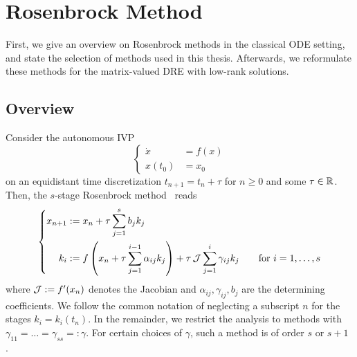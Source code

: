 \chapter{Rosenbrock Method}
\label{sec:ros}

First, we give an overview on Rosenbrock methods in the classical \ac{ODE} setting,
and state the selection of methods used in this thesis.
Afterwards, we reformulate these methods for the matrix-valued \ac{DRE} with low-rank solutions.

\section{Overview}

Consider the autonomous \ac{IVP}
\begin{equation}
\left\{
\begin{aligned}
  \dot x &= f(x) \\
  x(t_0) &= x_0
\end{aligned}
\right.
\end{equation}
on an equidistant time discretization $t_{n+1} = t_n + \tau$ for $n\geq 0$ and some $\tau\in\mathbb{R}$.
Then, the $s$-stage Rosenbrock method~ reads
\begin{equation}
\label{eq:ros:def}
\left\{
\begin{aligned}
  x_{n+1} &:= x_n + \tau \sum_{j=1}^s b_j k_j
  \\
  k_i &:= f\left( x_n + \tau \sum_{j=1}^{i-1} \alpha_{ij} k_j \right) + \tau \operatorname{\mathcal J} \sum_{j=1}^i \gamma_{ij} k_j
  \qquad
  \text{for } i = 1, \ldots, s
\end{aligned}
\right.
\end{equation}
where $\operatorname{\mathcal J} := f'(x_n)$ denotes the Jacobian and $\alpha_{ij}, \gamma_{ij}, b_j$ are the determining coefficients.
We follow the common notation of neglecting a subscript $n$ for the stages $k_i=k_i(t_n)$.
In the remainder, we restrict the analysis to methods with $\gamma_{11} = \ldots = \gamma_{ss} =: \gamma$.
For certain choices of $\gamma$, such a method is of order $s$ or $s+1$ \cite{HairerWanner2}.

